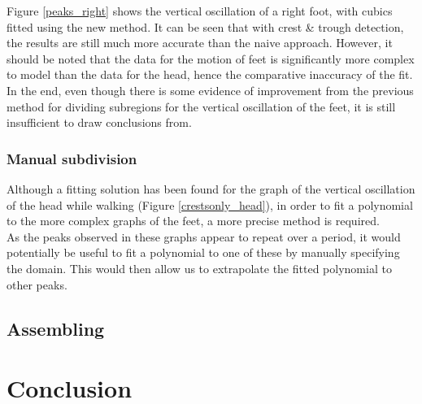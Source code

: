 \documentclass[12pt, a4paper]{article}
\begin{document}
Figure \ref{peaks_right} shows the vertical oscillation of a right foot, with
cubics fitted using the new method. It can be seen that with crest \& trough
detection, the results are still much more accurate than the naive approach.
However, it should be noted that the data for the motion of feet is
significantly more complex to model than the data for the head, hence the
comparative inaccuracy of the fit. In the end, even though there is some
evidence of improvement from the previous method for dividing subregions for the
vertical oscillation of the feet, it is still insufficient to draw conclusions
from.

\subsubsection{Manual subdivision}
Although a fitting solution has been found for the graph of the vertical
oscillation of the head while walking (Figure \ref{crestsonly_head}), in order
to fit a polynomial to the more complex graphs of the feet, a more precise
method is required. \\

As the peaks observed in these graphs appear to repeat over a period, it would
potentially be useful to fit a polynomial to one of these by manually specifying
the domain. This would then allow us to extrapolate the fitted polynomial to
other peaks. \\

\subsection{Assembling}

\section{Conclusion}

\end{document}

